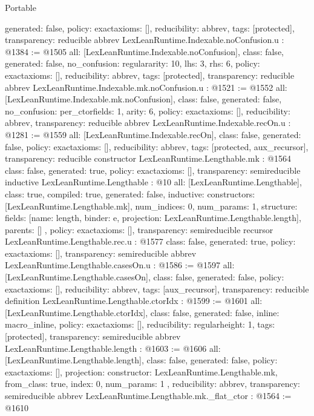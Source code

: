 \begin{lexlean}{Portable}
\begin{coremodule}
{  generated: false,
  policy: exact{axioms: []},
  reducibility: abbrev{},
  tags: [protected],
  transparency: reducible
}
abbrev LexLeanRuntime.Indexable.noConfusion.{u} : @1384 := @1505 {
  all: [LexLeanRuntime.Indexable.noConfusion],
  class: false,
  generated: false,
  no_confusion: regular{arity: 10, lhs: 3, rhs: 6},
  policy: exact{axioms: []},
  reducibility: abbrev{},
  tags: [protected],
  transparency: reducible
}
abbrev LexLeanRuntime.Indexable.mk.noConfusion.{u} : @1521 := @1552 {
  all: [LexLeanRuntime.Indexable.mk.noConfusion],
  class: false,
  generated: false,
  no_confusion: per_ctor{fields: 1, arity: 6},
  policy: exact{axioms: []},
  reducibility: abbrev{},
  transparency: reducible
}
abbrev LexLeanRuntime.Indexable.recOn.{u} : @1281 := @1559 {
  all: [LexLeanRuntime.Indexable.recOn],
  class: false,
  generated: false,
  policy: exact{axioms: []},
  reducibility: abbrev{},
  tags: [protected, aux_recursor],
  transparency: reducible
}
constructor LexLeanRuntime.Lengthable.mk : @1564 {
  class: false,
  generated: true,
  policy: exact{axioms: []},
  transparency: semireducible
}
inductive LexLeanRuntime.Lengthable : @10 {
  all: [LexLeanRuntime.Lengthable],
  class: true,
  compiled: true,
  generated: false,
  inductive: {
    constructors: [LexLeanRuntime.Lengthable.mk],
    num_indices: 0,
    num_params: 1,
    structure: {
      fields: [{name: length, binder: e, projection: LexLeanRuntime.Lengthable.length}],
      parents: []
    }
  },
  policy: exact{axioms: []},
  transparency: semireducible
}
recursor LexLeanRuntime.Lengthable.rec.{u} : @1577 {
  class: false,
  generated: true,
  policy: exact{axioms: []},
  transparency: semireducible
}
abbrev LexLeanRuntime.Lengthable.casesOn.{u} : @1586 := @1597 {
  all: [LexLeanRuntime.Lengthable.casesOn],
  class: false,
  generated: false,
  policy: exact{axioms: []},
  reducibility: abbrev{},
  tags: [aux_recursor],
  transparency: reducible
}
definition LexLeanRuntime.Lengthable.ctorIdx : @1599 := @1601 {
  all: [LexLeanRuntime.Lengthable.ctorIdx],
  class: false,
  generated: false,
  inline: macro_inline,
  policy: exact{axioms: []},
  reducibility: regular{height: 1},
  tags: [protected],
  transparency: semireducible
}
abbrev LexLeanRuntime.Lengthable.length : @1603 := @1606 {
  all: [LexLeanRuntime.Lengthable.length],
  class: false,
  generated: false,
  policy: exact{axioms: []},
  projection: {
    constructor: LexLeanRuntime.Lengthable.mk,
    from_class: true,
    index: 0,
    num_params: 1
  },
  reducibility: abbrev{},
  transparency: semireducible
}
abbrev LexLeanRuntime.Lengthable.mk._flat_ctor : @1564 := @1610 {
}
\end{coremodule}
\end{lexlean}
